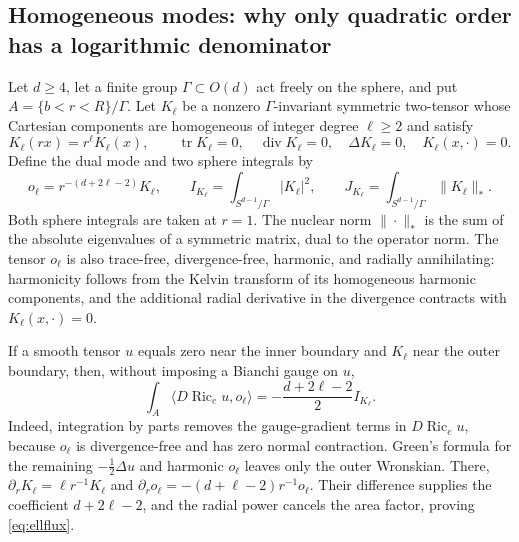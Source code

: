 \documentclass[a4paper,11pt]{article}
\numberwithin{equation}{section}
\theoremstyle{definition}
\newcommand{\Ric}{\operatorname{Ric}}
\newcommand{\tr}{\operatorname{tr}}
\begin{document}
\subsection{Homogeneous modes: why only quadratic order has a logarithmic denominator}\label{sec:ellflux}
Let $d\ge4$, let a finite group $\Gamma\subset O(d)$ act freely on the sphere, and put $A=\{b<r<R\}/\Gamma$. Let $K_\ell$ be a nonzero $\Gamma$-invariant symmetric two-tensor whose Cartesian components are homogeneous of integer degree $\ell\ge2$ and satisfy
\[
K_\ell(rx)=r^\ell K_\ell(x),\qquad
\tr K_\ell=0,\quad\operatorname{div}K_\ell=0,\quad
\Delta K_\ell=0,\quad K_\ell(x,\cdot)=0.
\]
Define the dual mode and two sphere integrals by
\[
o_\ell=r^{-(d+2\ell-2)}K_\ell,\qquad
I_{K_\ell}=\int_{S^{d-1}/\Gamma}|K_\ell|^2,\qquad
J_{K_\ell}=\int_{S^{d-1}/\Gamma}\|K_\ell\|_*.
\]
Both sphere integrals are taken at $r=1$. The nuclear norm $\|\cdot\|_*$ is the sum of the absolute eigenvalues of a symmetric matrix, dual to the operator norm. The tensor $o_\ell$ is also trace-free, divergence-free, harmonic, and radially annihilating: harmonicity follows from the Kelvin transform of its homogeneous harmonic components, and the additional radial derivative in the divergence contracts with $K_\ell(x,\cdot)=0$.

If a smooth tensor $u$ equals zero near the inner boundary and $K_\ell$ near the outer boundary, then, without imposing a Bianchi gauge on $u$,
\begin{equation}\label{eq:ellflux}
\int_A\langle D\Ric_e u,o_\ell\rangle
=-\frac{d+2\ell-2}{2}I_{K_\ell}.
\end{equation}
Indeed, integration by parts removes the gauge-gradient terms in $D\Ric_eu$, because $o_\ell$ is divergence-free and has zero normal contraction. Green's formula for the remaining $-\frac12\Delta u$ and harmonic $o_\ell$ leaves only the outer Wronskian. There,
$\partial_rK_\ell=\ell r^{-1}K_\ell$ and
$\partial_ro_\ell=-(d+\ell-2)r^{-1}o_\ell$. Their difference supplies the coefficient $d+2\ell-2$, and the radial power cancels the area factor, proving \eqref{eq:ellflux}.
\end{document}
